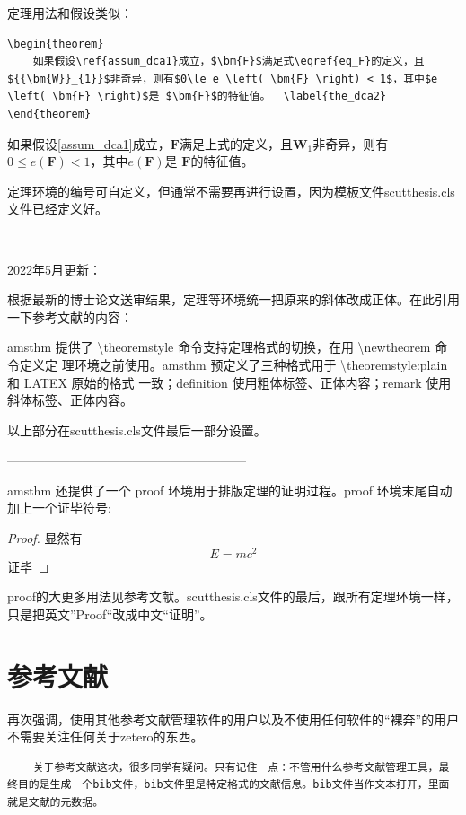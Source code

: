 定理用法和假设类似：
\begin{lstlisting}
\begin{theorem}
	如果假设\ref{assum_dca1}成立，$\bm{F}$满足式\eqref{eq_F}的定义，且${{\bm{W}}_{1}}$非奇异，则有$0\le e \left( \bm{F} \right) < 1$，其中$e \left( \bm{F} \right)$是 $\bm{F}$的特征值。	\label{the_dca2}
\end{theorem}
\end{lstlisting}
\begin{theorem}
	如果假设\ref{assum_dca1}成立，$\bm{F}$满足上式的定义，且${{\bm{W}}_{1}}$非奇异，则有$0\le e \left( \bm{F} \right) < 1$，其中$e \left( \bm{F} \right)$是 $\bm{F}$的特征值。	\label{the_dca2}
\end{theorem}

定理环境的编号可自定义，但通常不需要再进行设置，因为模板文件scutthesis.cls文件已经定义好。

---------------------------------------------------------

2022年5月更新：

根据最新的博士论文送审结果，定理等环境统一把原来的斜体改成正体。在此引用一下参考文献\cite{_g}的内容：

amsthm 提供了 \textbackslash{}theoremstyle 命令支持定理格式的切换，在用 \textbackslash{}newtheorem 命令定义定 理环境之前使用。amsthm 预定义了三种格式用于 \textbackslash{}theoremstyle:plain 和 LATEX 原始的格式 一致；definition 使用粗体标签、正体内容；remark 使用斜体标签、正体内容。

以上部分在scutthesis.cls文件最后一部分设置。

---------------------------------------------------------

amsthm 还提供了一个 proof 环境用于排版定理的证明过程。proof 环境末尾自动加上一个证毕符号:
\begin{proof}
	显然有
	\[
	E=mc^2
	\]
	证毕
\end{proof}

proof的大更多用法见参考文献\cite{_g}。scutthesis.cls文件的最后，跟所有定理环境一样，只是把英文”Proof“改成中文“证明”。

\section{参考文献}

再次强调，使用其他参考文献管理软件的用户以及不使用任何软件的“裸奔”的用户不需要关注任何关于zetero的东西。
\begin{lstlisting}
	关于参考文献这块，很多同学有疑问。只有记住一点：不管用什么参考文献管理工具，最终目的是生成一个bib文件，bib文件里是特定格式的文献信息。bib文件当作文本打开，里面就是文献的元数据。
\end{lstlisting}

